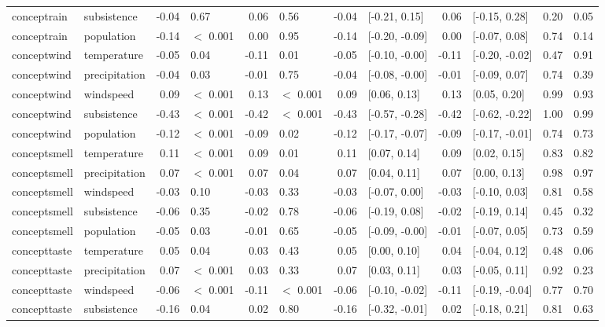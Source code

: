 \begin{table}[ht]
\begin{tabular}{llrlrlrlrlrr}
  conceptrain & subsistence & -0.04 & 0.67 & 0.06 & 0.56 & -0.04 & [-0.21, 0.15] & 0.06 & [-0.15, 0.28] & 0.20 & 0.05 \\ 
  conceptrain & population & -0.14 & $<$ 0.001 & 0.00 & 0.95 & -0.14 & [-0.20, -0.09] & 0.00 & [-0.07, 0.08] & 0.74 & 0.14 \\ 
  conceptwind & temperature & -0.05 & 0.04 & -0.11 & 0.01 & -0.05 & [-0.10, -0.00] & -0.11 & [-0.20, -0.02] & 0.47 & 0.91 \\ 
  conceptwind & precipitation & -0.04 & 0.03 & -0.01 & 0.75 & -0.04 & [-0.08, -0.00] & -0.01 & [-0.09, 0.07] & 0.74 & 0.39 \\ 
  conceptwind & windspeed & 0.09 & $<$ 0.001 & 0.13 & $<$ 0.001 & 0.09 & [0.06, 0.13] & 0.13 & [0.05, 0.20] & 0.99 & 0.93 \\ 
  conceptwind & subsistence & -0.43 & $<$ 0.001 & -0.42 & $<$ 0.001 & -0.43 & [-0.57, -0.28] & -0.42 & [-0.62, -0.22] & 1.00 & 0.99 \\ 
  conceptwind & population & -0.12 & $<$ 0.001 & -0.09 & 0.02 & -0.12 & [-0.17, -0.07] & -0.09 & [-0.17, -0.01] & 0.74 & 0.73 \\ 
  conceptsmell & temperature & 0.11 & $<$ 0.001 & 0.09 & 0.01 & 0.11 & [0.07, 0.14] & 0.09 & [0.02, 0.15] & 0.83 & 0.82 \\ 
  conceptsmell & precipitation & 0.07 & $<$ 0.001 & 0.07 & 0.04 & 0.07 & [0.04, 0.11] & 0.07 & [0.00, 0.13] & 0.98 & 0.97 \\ 
  conceptsmell & windspeed & -0.03 & 0.10 & -0.03 & 0.33 & -0.03 & [-0.07, 0.00] & -0.03 & [-0.10, 0.03] & 0.81 & 0.58 \\ 
  conceptsmell & subsistence & -0.06 & 0.35 & -0.02 & 0.78 & -0.06 & [-0.19, 0.08] & -0.02 & [-0.19, 0.14] & 0.45 & 0.32 \\ 
  conceptsmell & population & -0.05 & 0.03 & -0.01 & 0.65 & -0.05 & [-0.09, -0.00] & -0.01 & [-0.07, 0.05] & 0.73 & 0.59 \\ 
  concepttaste & temperature & 0.05 & 0.04 & 0.03 & 0.43 & 0.05 & [0.00, 0.10] & 0.04 & [-0.04, 0.12] & 0.48 & 0.06 \\ 
  concepttaste & precipitation & 0.07 & $<$ 0.001 & 0.03 & 0.33 & 0.07 & [0.03, 0.11] & 0.03 & [-0.05, 0.11] & 0.92 & 0.23 \\ 
  concepttaste & windspeed & -0.06 & $<$ 0.001 & -0.11 & $<$ 0.001 & -0.06 & [-0.10, -0.02] & -0.11 & [-0.19, -0.04] & 0.77 & 0.70 \\ 
  concepttaste & subsistence & -0.16 & 0.04 & 0.02 & 0.80 & -0.16 & [-0.32, -0.01] & 0.02 & [-0.18, 0.21] & 0.81 & 0.63 \\ 

\end{tabular}
\end{table}
